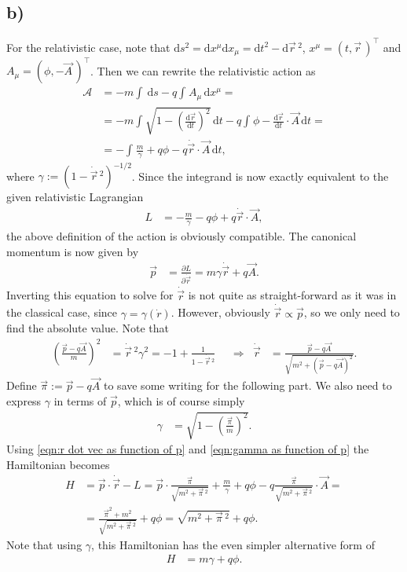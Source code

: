 \documentclass[english, parskip=full]{scrartcl}
\newcommand{\intx}{}
\newcommand{\kla}{}
\newcommand{\tecxt}{}
\begin{document}
\subsection*{b)}
For the relativistic case, note that $\tecxt\text{d}s^2=\tecxt\text{d}x^\mu\tecxt\text{d}x_\mu=\tecxt\text{d}t^2-\tecxt\text{d}\vec{r}\,^2$, $x^\mu=(t,\vec{r}\,)^\top$ and $A_\mu=(\phi,-\vec{A}\,)^\top$. %
Then we can rewrite the relativistic action as 
\begin{align}
\mathcal{A}&=-m\intx\int_{ }^{ }\, \mathrm{d}s-q\intx\int_{ }^{ }A_\mu \, \mathrm{d}x^\mu =\\
&=-m\intx\int_{ }^{ }\sqrt{1-\kla\left( \frac{\tecxt\text{d}\vec{r}}{\tecxt\text{d}t} \right)^2}\, \mathrm{d}t-q\intx\int_{ }^{ }\phi -\frac{\tecxt\text{d}\vec{r}}{\tecxt\text{d}t}\cdot\vec{A}\, \mathrm{d}t=\\
&=-\intx\int_{ }^{ }\frac{m}{\gamma}+q\phi -q\dot{\vec{r}}\cdot\vec{A}\, \mathrm{d}t,
\end{align}
where $\gamma := \kla\left( 1- \dot{\vec{r}}\,^2 \right)^{-1/2}$.
Since the integrand is now exactly equivalent to the given relativistic Lagrangian
\begin{align}
L&=-\frac{m}{\gamma}-q\phi +q\dot{\vec{r}}\cdot\vec{A},
\end{align}
the above definition of the action is obviously compatible.
The canonical momentum is now given by
\begin{align}
\vec{p}&=\frac{\partial L}{\partial \dot{\vec{r}}}=m\gamma\dot{\vec{r}}+q\vec{A}.
\end{align}
Inverting this equation to solve for $\dot\vec{r}$ is not quite as straight-forward as it was in the classical case, since $\gamma=\gamma(\dot{r})$.
However, obviously $\dot{\vec{r}}\propto\vec{p}$, so we only need to find the absolute value.
Note that
\begin{align}
\kla\left( \frac{\vec{p}-q\vec{A}}{m} \right)^2&=\dot{\vec{r}}\,^2\gamma^2=-1+\frac{1}{1-\dot{\vec{r}}\,^2}&&\Rightarrow&\dot{\vec{r}}&=\frac{\vec{p}-q\vec{A}}{\sqrt{m^2+\kla\left( \vec{p}-q\vec{A} \right)^2}}. \label{eqn:r dot vec as function of p}
\end{align}
Define $\vec{\pi}:=\vec{p}-q\vec{A}$ to save some writing for the following part.
We also need to express $\gamma$ in terms of $\vec{p}$, which is of course simply
\begin{align}
\gamma&=\sqrt{1-\kla\left( \frac{\vec{\pi}}{m} \right)^2}. \label{eqn:gamma as function of p}
\end{align}
Using \eqref{eqn:r dot vec as function of p} and \eqref{eqn:gamma as function of p} the Hamiltonian becomes
\begin{align}
H&=\vec{p}\cdot\dot{\vec{r}}-L=\vec{p}\cdot \frac{\vec{\pi}}{\sqrt{m^2+\vec{\pi}\,^2}}+\frac{m}{\gamma}+q\phi-q\frac{\vec{\pi}}{\sqrt{m^2+\vec{\pi}\,^2}}\cdot\vec{A}=\\
&=\frac{\vec{\pi}^2+m^2}{\sqrt{m^2+\vec{\pi}\,^2}}+q\phi=\sqrt{m^2+\vec{\pi}\,^2}+q\phi.
\end{align}
Note that using $\gamma$, this Hamiltonian has the even simpler alternative form of
\begin{align}
H&=m\gamma +q\phi.
\end{align}


\end{document}
